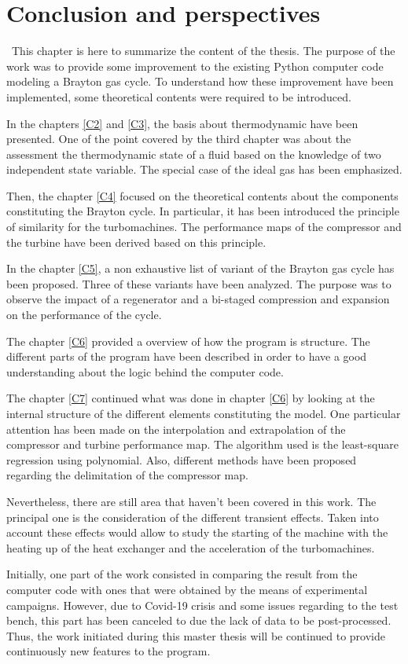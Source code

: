 \chapter{Conclusion and perspectives}
\quad\ This chapter is here to summarize the content of the thesis. The purpose of the work was to provide some improvement to the existing Python computer code modeling a Brayton gas cycle. To understand how these improvement have been implemented, some theoretical contents were required to be introduced. 

In the chapters \ref{C2} and \ref{C3}, the basis about thermodynamic have been presented. One of the point covered by the third chapter was about the assessment the thermodynamic state of a fluid based on the knowledge of two independent state variable. The special case of the ideal gas has been emphasized.

Then, the chapter \ref{C4} focused on the theoretical contents about the components constituting the Brayton cycle. In particular, it has been introduced the principle of similarity for the turbomachines. The performance maps of the compressor and the turbine have been derived based on this principle. 

In the chapter \ref{C5}, a non exhaustive list of variant of the Brayton gas cycle has been proposed. Three of these variants have been analyzed. The purpose was to observe the impact of a regenerator and a bi-staged compression and expansion on the performance of the cycle. 

The chapter \ref{C6} provided a overview of how the program is structure. The different parts of the program have been described in order to have a good understanding about the logic behind the computer code. 

The chapter \ref{C7} continued what was done in chapter \ref{C6} by looking at the internal structure of the different elements constituting the model. One particular attention has been made on the interpolation and extrapolation of the compressor and turbine performance map. The algorithm used is the least-square regression using polynomial. Also, different methods have been proposed regarding the delimitation of the compressor map. 

Nevertheless, there are still area that haven't been covered in this work. The principal one is the consideration of the different transient effects. Taken into account these effects would allow to study the starting of the machine with the heating up of the heat exchanger and the acceleration of the turbomachines. 

Initially, one part of the work consisted in comparing the result from the computer code with ones that were obtained by the means of experimental campaigns. However, due to Covid-19 crisis and some issues regarding to the test bench, this part has been canceled to due the lack of data to be post-processed. Thus, the work initiated during this master thesis will be continued to provide continuously new features to the program. 

